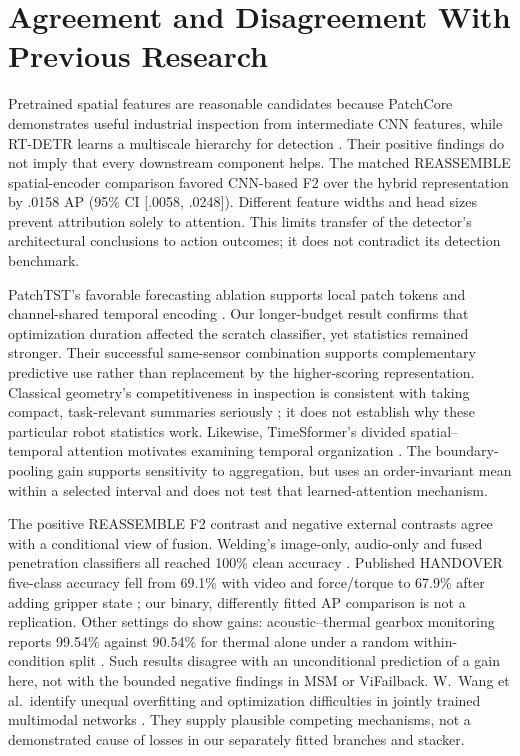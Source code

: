 \section{Agreement and Disagreement With Previous Research}
Pretrained spatial features are reasonable candidates because PatchCore demonstrates useful industrial inspection from intermediate CNN features, while RT-DETR learns a multiscale hierarchy for detection \citep{Roth2022Towards,Zhao2024RTDETR}. Their positive findings do not imply that every downstream component helps. The matched REASSEMBLE spatial-encoder comparison favored CNN-based F2 over the hybrid representation by .0158 AP (95\% CI [.0058, .0248]). Different feature widths and head sizes prevent attribution solely to attention. This limits transfer of the detector's architectural conclusions to action outcomes; it does not contradict its detection benchmark.

PatchTST's favorable forecasting ablation supports local patch tokens and channel-shared temporal encoding \citep{Nie2023PatchTST}. Our longer-budget result confirms that optimization duration affected the scratch classifier, yet statistics remained stronger. Their successful same-sensor combination supports complementary predictive use rather than replacement by the higher-scoring representation. Classical geometry's competitiveness in inspection is consistent with taking compact, task-relevant summaries seriously \citep{Horwitz2023Back}; it does not establish why these particular robot statistics work. Likewise, TimeSformer's divided spatial--temporal attention motivates examining temporal organization \citep{P034}. The boundary-pooling gain supports sensitivity to aggregation, but uses an order-invariant mean within a selected interval and does not test that learned-attention mechanism.

The positive REASSEMBLE F2 contrast and negative external contrasts agree with a conditional view of fusion. Welding's image-only, audio-only and fused penetration classifiers all reached 100\% clean accuracy \citep[Tables~1--3]{Hua2026Weld}. Published HANDOVER five-class accuracy fell from 69.1\% with video and force/torque to 67.9\% after adding gripper state \citep[Table~III]{Thoduka2024Handover}; our binary, differently fitted AP comparison is not a replication. Other settings do show gains: acoustic--thermal gearbox monitoring reports 99.54\% against 90.54\% for thermal alone under a random within-condition split \citep[Table~2]{Ying2025Trustworthy}. Such results disagree with an unconditional prediction of a gain here, not with the bounded negative findings in MSM or ViFailback. W.~Wang et al.\ identify unequal overfitting and optimization difficulties in jointly trained multimodal networks \citep{Wang2020What}. They supply plausible competing mechanisms, not a demonstrated cause of losses in our separately fitted branches and stacker.

